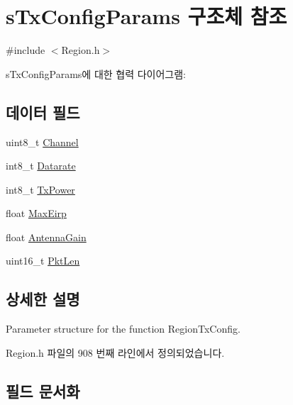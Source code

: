 \hypertarget{structs_tx_config_params}{}\section{s\+Tx\+Config\+Params 구조체 참조}
\label{structs_tx_config_params}


{\ttfamily \#include $<$Region.\+h$>$}



s\+Tx\+Config\+Params에 대한 협력 다이어그램\+:
\subsection*{데이터 필드}
\begin{DoxyCompactItemize}
\item 
uint8\+\_\+t \mbox{\hyperlink{structs_tx_config_params_a1ca6f01ca18afe402de51babe8c95f5e}{Channel}}
\item 
int8\+\_\+t \mbox{\hyperlink{structs_tx_config_params_ae2f6080f3aa0e9485c55513ca56bb24d}{Datarate}}
\item 
int8\+\_\+t \mbox{\hyperlink{structs_tx_config_params_a037b4f849fa8ed4aa1d3c58aef2b28ec}{Tx\+Power}}
\item 
float \mbox{\hyperlink{structs_tx_config_params_abacf3c28f803460c8947f0b0077fcf5c}{Max\+Eirp}}
\item 
float \mbox{\hyperlink{structs_tx_config_params_a727eaefd87f898a5238118573968962c}{Antenna\+Gain}}
\item 
uint16\+\_\+t \mbox{\hyperlink{structs_tx_config_params_aff9de7b29c2d9ebf3fa963f2ba09c121}{Pkt\+Len}}
\end{DoxyCompactItemize}


\subsection{상세한 설명}
Parameter structure for the function Region\+Tx\+Config. 

Region.\+h 파일의 908 번째 라인에서 정의되었습니다.



\subsection{필드 문서화}
\mbox{\label{structs_tx_config_params_a727eaefd87f898a5238118573968962c}} 
